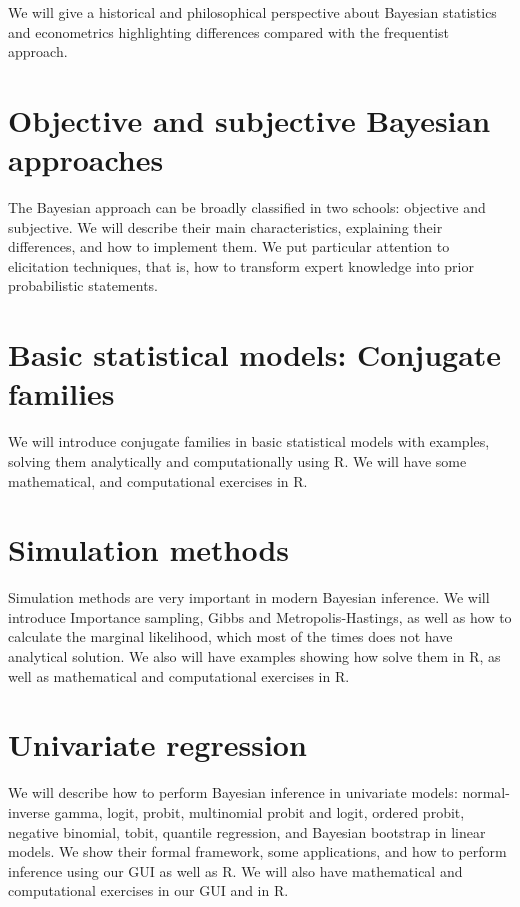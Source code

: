 \documentclass[
]{book}
\begin{document}
We will give a historical and philosophical perspective about Bayesian statistics and econometrics highlighting differences compared with the frequentist approach.

\hypertarget{objective-and-subjective-bayesian-approaches}{%
\chapter{Objective and subjective Bayesian approaches}\label{objective-and-subjective-bayesian-approaches}}

The Bayesian approach can be broadly classified in two schools: objective and subjective. We will describe their main characteristics, explaining their differences, and how to implement them. We put particular attention to elicitation techniques, that is, how to transform expert knowledge into prior probabilistic statements.

\hypertarget{basic-statistical-models-conjugate-families}{%
\chapter{Basic statistical models: Conjugate families}\label{basic-statistical-models-conjugate-families}}

We will introduce conjugate families in basic statistical models with examples, solving them analytically and computationally using R. We will have some mathematical, and computational exercises in R.

\hypertarget{sim}{%
\chapter{Simulation methods}\label{sim}}

Simulation methods are very important in modern Bayesian inference. We will introduce Importance sampling, Gibbs and Metropolis-Hastings, as well as how to calculate the marginal likelihood, which most of the times does not have analytical solution. We also will have examples showing how solve them in R, as well as mathematical and computational exercises in R.

\hypertarget{unireg}{%
\chapter{Univariate regression}\label{unireg}}

We will describe how to perform Bayesian inference in univariate models: normal-inverse gamma, logit, probit, multinomial probit and logit, ordered probit, negative binomial, tobit, quantile regression, and Bayesian bootstrap in linear models. We show their formal framework, some applications, and how to perform inference using our GUI as well as R. We will also have mathematical and computational exercises in our GUI and in R.
\end{document}
